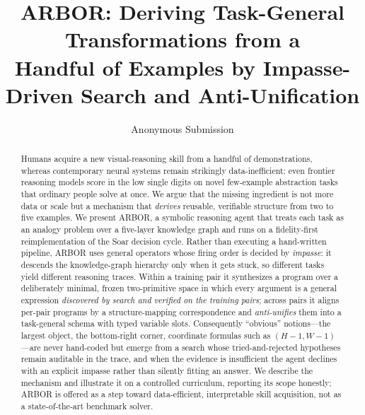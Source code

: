 \documentclass[letterpaper]{article} %
\title{ARBOR: Deriving Task-General Transformations from a\\
Handful of Examples by Impasse-Driven Search and Anti-Unification}
\author{
    Anonymous Submission
}
\begin{document}
\maketitle

\begin{abstract}
Humans acquire a new visual-reasoning skill from a handful of demonstrations,
whereas contemporary neural systems remain strikingly data-inefficient: even
frontier reasoning models score in the low single digits on novel few-example
abstraction tasks that ordinary people solve at once. We argue that the missing
ingredient is not more data or scale but a mechanism that \emph{derives}
reusable, verifiable structure from two to five examples. We present ARBOR, a
symbolic reasoning agent that treats each task as an analogy problem over a
five-layer knowledge graph and runs on a fidelity-first reimplementation of the
Soar decision cycle. Rather than executing a hand-written pipeline, ARBOR uses
general operators whose firing order is decided by \emph{impasse}: it descends
the knowledge-graph hierarchy only when it gets stuck, so different tasks yield
different reasoning traces. Within a training pair it synthesizes a program over
a deliberately minimal, frozen two-primitive space in which every argument is a
general expression \emph{discovered by search and verified on the training
pairs}; across pairs it aligns per-pair programs by a structure-mapping
correspondence and \emph{anti-unifies} them into a task-general schema with
typed variable slots. Consequently ``obvious'' notions---the largest object, the
bottom-right corner, coordinate formulas such as $(H-1,W-1)$---are never
hand-coded but emerge from a search whose tried-and-rejected hypotheses remain
auditable in the trace, and when the evidence is insufficient the agent declines
with an explicit impasse rather than silently fitting an answer. We describe the
mechanism and illustrate it on a controlled curriculum, reporting its scope
honestly; ARBOR is offered as a step toward data-efficient, interpretable skill
acquisition, not as a state-of-the-art benchmark solver.
\end{abstract}


\end{document}

